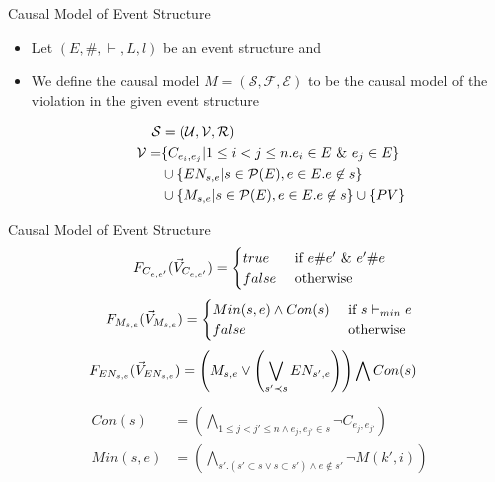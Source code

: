 \begin{frame}{Causal Model of Event Structure}
    \begin{itemize}
        \item Let $(E,\#,\vdash,L,l)$ be an event structure
              and         
              \item We define the causal model $M = (\mathcal{S},\mathcal{F},\mathcal{E})$
              to be the causal model of the violation in the given event structure

              \begin{align*}
                  \mathcal{S}     & = (\mathcal{U},\mathcal{V},\mathcal{R})  \\
                  \mathcal{V} =   & \{C_{e_i,e_j} |  1 \leq i < j \leq n.
                  e_i \in E \ \& \  e_j \in E\}                                  \\
                                  & \cup \{EN_{s,e} | s \in \mathcal{P}(E),
                  e \in E. e \not \in s \}                                    \\
                                  & \cup \{M_{s,e} | s \in \mathcal{P}(E),
                  e \in E. e \not \in s \} \cup \{PV\}                     \\
              \end{align*}
    \end{itemize}
\end{frame}

\begin{frame}{Causal Model of Event Structure}
    $$
        F_{C_{e,e'}}(\vec V_{C_{e,e'}}) = \begin{cases}
            true  & \text{ if } e \# e' \ \& \  e' \# e \\
            false & \text{ otherwise }
        \end{cases}
    $$
    $$
        F_{M_{s,e}}(\vec V_{M_{s,e}}) = \begin{cases}
            Min(s,e) \wedge Con(s) & \text{ if } s \vdash_{min} e \\
            false                  & \text{ otherwise }
        \end{cases}
    $$
    \begin{align*}
        F_{EN_{s,e}}(\vec V_{EN_{s,e}}) & = \left( M_{s,e} \vee
        \left( \bigvee_{s'\prec s}EN_{s',e} \right)
        \right) \bigwedge Con(s)
    \end{align*}
    \begin{align*}
        Con(s)   & =   \left(
        \bigwedge_{ 1\leq j<j' \leq n \wedge e_j,e_{j'} \in s}
        \neg C_{e_j,e_{j'}}
        \right)               \\
        Min(s,e) & = \left(
        \bigwedge_{s'. (s' \subset s \vee s \subset s')
            \wedge e \notin s'}
        \neg M(k',i)
        \right)
    \end{align*}
\end{frame}

